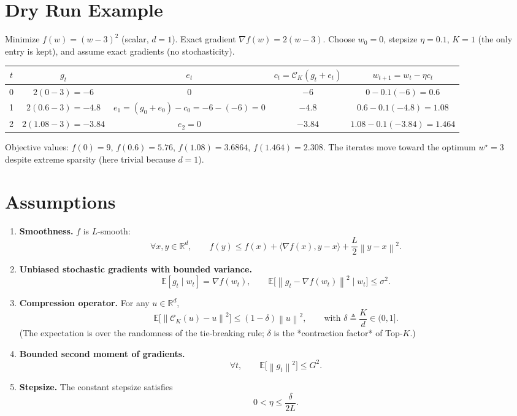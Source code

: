 \documentclass{article}
\newcommand{\E}{\mathbb{E}}
\newcommand{\R}{\mathbb{R}}
\newcommand{\norm}[1]{\left\|#1\right\|}
\newcommand{\grad}{\nabla}
\newcommand{\topk}[1]{\mathcal{C}_{K}(#1)}
\begin{document}
\section*{Dry Run Example}
Minimize $f(w)=(w-3)^2$ (scalar, $d=1$).  
Exact gradient $\grad f(w)=2(w-3)$.  
Choose $w_0=0$, stepsize $\eta=0.1$, $K=1$ (the only entry is kept), and assume exact gradients (no stochasticity).  

\begin{center}
\begin{tabular}{c|c|c|c|c}
$t$ & $g_t$ & $e_t$ & $c_t=\topk{g_t+e_t}$ & $w_{t+1}=w_t-\eta c_t$ \\ \midrule
0 & $2(0-3)=-6$ & $0$ & $-6$ & $0-0.1(-6)=0.6$ \\
1 & $2(0.6-3)=-4.8$ & $e_1=(g_0+e_0)-c_0= -6-(-6)=0$ & $-4.8$ & $0.6-0.1(-4.8)=1.08$ \\
2 & $2(1.08-3)=-3.84$ & $e_2=0$ & $-3.84$ & $1.08-0.1(-3.84)=1.464$ \\
\end{tabular}
\end{center}

Objective values: $f(0)=9$, $f(0.6)=5.76$, $f(1.08)=3.6864$, $f(1.464)=2.308$.  
The iterates move toward the optimum $w^{\star}=3$ despite extreme sparsity (here trivial because $d=1$).

\newpage
\section*{Assumptions}
\begin{enumerate}[label=\textbf{A\arabic*}.]
\item \textbf{Smoothness.} $f$ is $L$‑smooth:
\[
\forall x,y\in\R^{d},\qquad
f(y)\le f(x)+\langle\grad f(x),y-x\rangle+\frac{L}{2}\norm{y-x}^{2}.
\tag{A1}
\]

\item \textbf{Unbiased stochastic gradients with bounded variance.}
\[
\E[g_t\mid w_t]=\grad f(w_t),\qquad
\E\big[\norm{g_t-\grad f(w_t)}^{2}\mid w_t\big]\le\sigma^{2}.
\tag{A2}
\]

\item \textbf{Compression operator.} For any $u\in\R^{d}$,
\[
\E\!\big[\norm{\topk{u}-u}^{2}\big]\le (1-\delta)\norm{u}^{2},
\qquad\text{with }\delta\triangleq\frac{K}{d}\in(0,1].
\tag{A3}
\]
(The expectation is over the randomness of the tie‑breaking rule; $\delta$ is the *contraction factor* of Top‑$K$.)

\item \textbf{Bounded second moment of gradients.}
\[
\forall t,\qquad \E\!\big[\norm{g_t}^{2}\big]\le G^{2}.
\tag{A4}
\]

\item \textbf{Stepsize.} The constant stepsize satisfies
\[
0<\eta\le\frac{\delta}{2L}.
\tag{A5}
\]
\end{enumerate}
\end{document}
